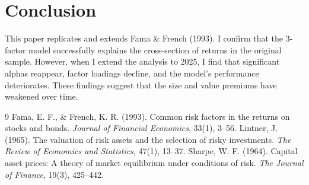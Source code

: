 \documentclass[11pt]{article}
\begin{document}
\section{Conclusion}
This paper replicates and extends Fama \& French (1993). I confirm that the 3-factor model successfully explains the cross-section of returns in the original sample. However, when I extend the analysis to 2025, I find that significant alphas reappear, factor loadings decline, and the model's performance deteriorates. These findings suggest that the size and value premiums have weakened over time.

\begin{thebibliography}{9}
 Fama, E. F., \& French, K. R. (1993). Common risk factors in the returns on stocks and bonds. \textit{Journal of Financial Economics}, 33(1), 3--56.
 Lintner, J. (1965). The valuation of risk assets and the selection of risky investments. \textit{The Review of Economics and Statistics}, 47(1), 13--37.
 Sharpe, W. F. (1964). Capital asset prices: A theory of market equilibrium under conditions of risk. \textit{The Journal of Finance}, 19(3), 425--442.
\end{thebibliography}
\end{document}

